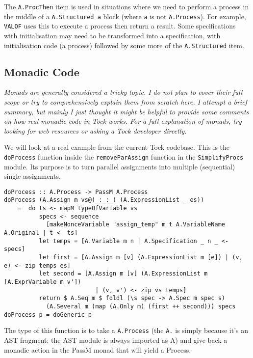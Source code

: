 \documentclass[a4wide]{article}
\begin{document}
The \lstinline|A.ProcThen| item is used in situations where we need to perform a process in the
middle of a \lstinline|A.Structured a| block (where \lstinline|a| is not \lstinline|A.Process|).
For example, \lstinline|VALOF| uses this to execute a process then return a result.  Some 
specifications with initialisation may need to be transformed into a specification, with
initialisation code (a process) followed by some more of the \lstinline|A.Structured| item.

\subsection{Monadic Code}

\textit{Monads are generally considered a tricky topic.  I do not plan to cover their full scope
or try to comprehensively explain them from scratch here.  I attempt a brief summary, but mainly
I just thought it might be helpful to provide some comments
on how real monadic code in Tock works.  For a full explanation of monads, try looking for web
resources or asking a Tock developer directly.}

We will look at a real example from the current Tock codebase.  This is the \lstinline|doProcess| function
inside the \lstinline|removeParAssign| function in the \lstinline|SimplifyProcs| module.  Its purpose
is to turn parallel assignments into multiple (sequential) single assignments.

\begin{lstlisting}
doProcess :: A.Process -> PassM A.Process
doProcess (A.Assign m vs@(_:_:_) (A.ExpressionList _ es))
    =  do ts <- mapM typeOfVariable vs
          specs <- sequence
            [makeNonceVariable "assign_temp" m t A.VariableName A.Original | t <- ts]
          let temps = [A.Variable m n | A.Specification _ n _ <- specs]
          let first = [A.Assign m [v] (A.ExpressionList m [e]) | (v, e) <- zip temps es]
          let second = [A.Assign m [v] (A.ExpressionList m [A.ExprVariable m v'])
                          | (v, v') <- zip vs temps]
          return $ A.Seq m $ foldl (\s spec -> A.Spec m spec s)
            (A.Several m (map (A.Only m) (first ++ second))) specs
doProcess p = doGeneric p
\end{lstlisting}

The type of this function is to take a \lstinline|A.Process| (the \lstinline |A.| is simply because it's an AST
fragment; the AST module is always imported as A) and give back a monadic action in the PassM monad that will yield
a Process.
\end{document}
